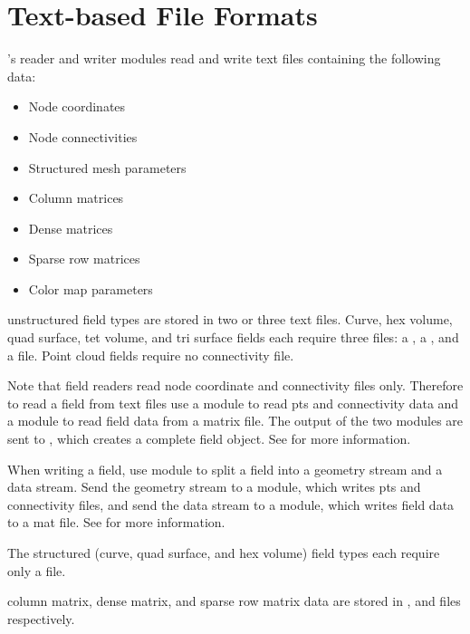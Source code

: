 \section{Text-based File Formats}

\sr{}'s reader and writer modules read and write text files containing the
following data:

\begin{itemize}
\item Node coordinates
\item Node connectivities
\item Structured mesh parameters
\item Column matrices
\item Dense matrices
\item Sparse row matrices
\item Color map parameters
\end{itemize}

\sr{} unstructured field types are stored in two or three text files.
Curve, hex volume, quad surface, tet volume, and tri surface fields
each require three files: a , a
, and a  file.  Point cloud fields require no
connectivity file.  

Note that field readers read node coordinate and connectivity files
only.  Therefore to read a field from text files use a
 module to read pts and connectivity data and a
 module to read field data from a matrix file.
The output of the two modules are sent to ,
which creates a complete field object.  See  for more information.

When writing a field, use module 
to split a field into a geometry stream and a data stream.  Send the
geometry stream to a  module, which writes pts and
connectivity files, and send the data stream to a
 module, which writes field data to a mat file.  See
 for more information.

The structured (curve, quad surface, and hex volume) field types each
require only a  file.

\sr{} column matrix, dense matrix, and sparse row matrix data are
stored in ,  and  files respectively.

